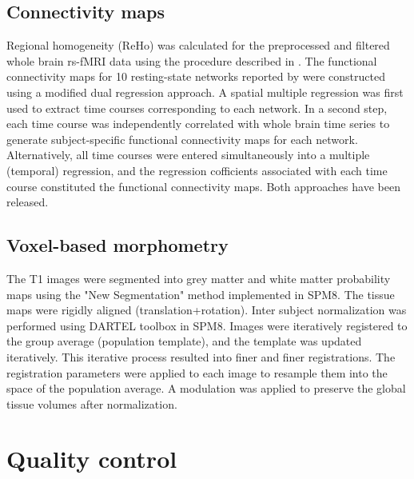 \documentclass[preprint,12pt,3p]{elsarticle}
\begin{document}
\subsection{Connectivity maps}
Regional homogeneity (ReHo) was calculated for the preprocessed and filtered whole brain rs-fMRI data using the procedure described in \citep{zang2004regional}. The functional connectivity maps for 10 resting-state networks reported by \cite{smith2009correspondence} were constructed using a modified dual regression approach. A spatial multiple regression was first used to extract time courses corresponding to each network. In a second step, each time course was independently correlated with whole brain time series to generate subject-specific functional connectivity maps for each network. Alternatively, all time courses were entered simultaneously into a multiple (temporal) regression, and the regression cofficients associated with each time course constituted the functional connectivity maps. Both approaches have been released.

\subsection{Voxel-based morphometry}
The T1 images were segmented into grey matter and white matter probability maps using the "New Segmentation" method implemented in SPM8. The tissue maps were rigidly aligned (translation+rotation). Inter subject normalization was performed using DARTEL toolbox in SPM8. Images were iteratively registered to the group average (population template), and the template was updated iteratively. This iterative process resulted into finer and finer registrations. The registration parameters were applied to each image to resample them into the space of the population average. A modulation was applied to preserve the global tissue volumes after normalization.



\section{Quality control}
\end{document}
